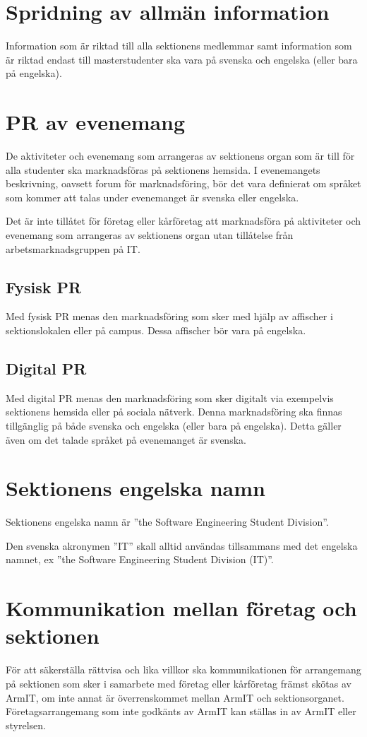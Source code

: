 \documentclass[11pt, includeaddress]{classes/cthit}
\begin{document}
\section{Spridning av allmän information}
Information som är riktad till alla sektionens medlemmar samt information som är riktad endast till masterstudenter ska vara på svenska och engelska (eller bara på engelska).

\newpage

\section{PR av evenemang}
De aktiviteter och evenemang som arrangeras av sektionens organ som är till för alla studenter ska marknadsföras på sektionens hemsida. I evenemangets beskrivning, oavsett forum för marknadsföring, bör det vara definierat om språket som kommer att talas under evenemanget är svenska eller engelska.

Det är inte tillåtet för företag eller kårföretag att marknadsföra på aktiviteter och evenemang som arrangeras av sektionens organ utan tillåtelse från arbetsmarknadsgruppen på IT.

\subsection*{Fysisk PR}
Med fysisk PR menas den marknadsföring som sker med hjälp av affischer i sektionslokalen eller på campus. Dessa affischer bör vara på engelska.
\subsection*{Digital PR}
Med digital PR menas den marknadsföring som sker digitalt via exempelvis sektionens hemsida eller på sociala nätverk. Denna marknadsföring ska finnas tillgänglig på både svenska och engelska (eller bara på engelska). Detta gäller även om det talade språket på evenemanget är svenska.

\section{Sektionens engelska namn}
Sektionens engelska namn är ''the Software Engineering Student Division''.

Den svenska akronymen ''IT'' skall alltid användas tillsammans med det engelska namnet, ex ''the Software Engineering Student Division (IT)''.

\section{Kommunikation mellan företag och sektionen}
För att säkerställa rättvisa och lika villkor ska kommunikationen för arrangemang på sektionen som sker i samarbete med företag eller kårföretag främst skötas av ArmIT, om inte annat är överrenskommet mellan ArmIT och sektionsorganet. Företagsarrangemang som inte godkänts av ArmIT kan ställas in av ArmIT eller styrelsen.
\end{document}

